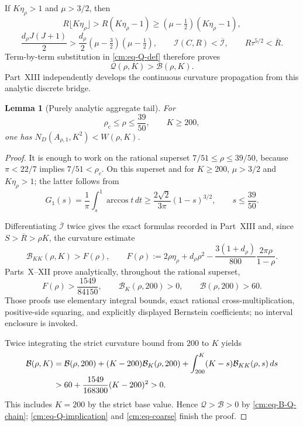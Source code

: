 \documentclass[11pt]{article}
\numberwithin{equation}{section}
\newtheorem{lemma}[theorem]{Lemma}
\theoremstyle{definition}
\theoremstyle{remark}
\begin{document}
If \(K\eta_\rho>1\) and \(\mu>3/2\), then
\[
 R\lfloor K\eta_\rho\rfloor
 >R(K\eta_\rho-1)
 \geq(\mu-\tfrac12)(K\eta_\rho-1),
\]
\[
 \frac{d_\rho J(J+1)}2
 >\frac{d_\rho}{2}(\mu-\tfrac32)(\mu-\tfrac12),\qquad
 \mathcal I(C,R)<\overline{\mathcal I},\qquad
 R\tau^{5/2}<\overline R.
\]
Term-by-term substitution in \eqref{cm:eq-Q-def} therefore proves
\begin{equation}
 \mathcal Q(\rho,K)>\mathcal B(\rho,K).
 \label{cm:eq-B-Q-chain}
\end{equation}
Part~XIII independently develops the continuous curvature propagation
from this analytic discrete bridge.

\begin{lemma}[Purely analytic aggregate tail]
\label{cm:lem-aggregate-tail}
For
\[
 \rho_c\leq\rho\leq\frac{39}{50},
 \qquad K\geq200,
\]
one has \(N_D(A_{\rho,1},K^2)<W(\rho,K)\).
\end{lemma}

\begin{proof}
It is enough to work on the rational superset
\(7/51\leq\rho\leq39/50\), because \(\pi<22/7\) implies
\(7/51<\rho_c\).  On this superset and for \(K\geq200\),
\(\mu>3/2\) and \(K\eta_\rho>1\); the latter follows from
\[
 G_1(s)=\frac1\pi\int_s^1\arccos t\,dt
 \geq\frac{2\sqrt2}{3\pi}(1-s)^{3/2},
 \qquad s\leq\frac{39}{50}.
\]

Differentiating \(\overline{\mathcal I}\) twice gives the exact formulas
recorded in Part~XIII and, since
\(S>\overline R>\rho K\), the curvature estimate
\[
 \mathcal B_{KK}(\rho,K)>F(\rho),
 \qquad
 F(\rho):=
 2\rho\eta_\rho+d_\rho\rho^2
 -\frac{3(1+d_\rho)}{800}\frac{2\pi\rho}{1-\rho}.
\]
Parts~X--XII prove analytically, throughout the rational superset,
\begin{equation}
 F(\rho)>\frac{1549}{84150},\qquad
 \mathcal B_K(\rho,200)>0,\qquad
 \mathcal B(\rho,200)>60.
 \label{cm:eq-analytic-base-signs}
\end{equation}
Those proofs use elementary integral bounds, exact rational
cross-multiplication, positive-side squaring, and explicitly displayed
Bernstein coefficients; no interval enclosure is invoked.

Twice integrating the strict curvature bound from \(200\) to \(K\) yields
\begin{align}
 \mathcal B(\rho,K)
 &=
 \mathcal B(\rho,200)
 +(K-200)\mathcal B_K(\rho,200)
 +\int_{200}^K(K-s)\mathcal B_{KK}(\rho,s)\,ds\notag\\
 &>60+\frac{1549}{168300}(K-200)^2>0.
 \label{cm:eq-analytic-tail-reserve}
\end{align}
This includes \(K=200\) by the strict base value.  Hence
\(\mathcal Q>\mathcal B>0\) by \eqref{cm:eq-B-Q-chain};
\eqref{cm:eq-Q-implication} and \eqref{cm:eq-coarse} finish the proof.
\end{proof}
\end{document}
